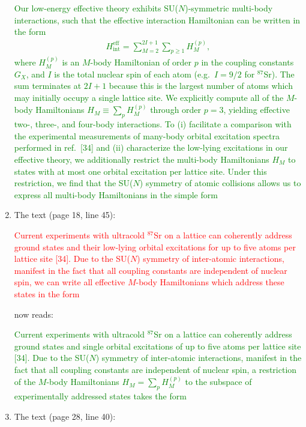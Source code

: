 \documentclass[preprint]{revtex4-1}
\renewcommand{\t}{\text} %
\newcommand{\1}{\mathds{1}}
\newcommand{\red}[1]{\textcolor{red}{#1}}
\newcommand{\green}[1]{\textcolor{green}{#1}}
\newcounter{point}
\begin{document}
\begin{enumerate}[label=(R1.\arabic{point}.\arabic*)]
  \green{Our low-energy effective theory exhibits SU($N$)-symmetric
    multi-body interactions, such that the effective interaction
    Hamiltonian can be written in the form
    \begin{align*}
      H_{\t{int}}^{\t{eff}} = \sum_{M=2}^{2I+1} \sum_{p\ge1} H_M^{(p)},
      \tag{9}
    \end{align*}
    where $H_M^{(p)}$ is an $M$-body Hamiltonian of order $p$ in the
    coupling constants $G_X$, and $I$ is the total nuclear spin of
    each atom (e.g.~$I=9/2$ for ${}^{87}$Sr).  The sum terminates at
    $2I+1$ because this is the largest number of atoms which may
    initially occupy a single lattice site.  We explicitly compute all
    of the $M$-body Hamiltonians $H_M\equiv\sum_p H_M^{(p)}$ through
    order $p=3$, yielding effective two-, three-, and four-body
    interactions.  To (i) facilitate a comparison with the
    experimental measurements of many-body orbital excitation spectra
    performed in ref.~[34] and (ii) characterize the low-lying
    excitations in our effective theory, we additionally restrict the
    multi-body Hamiltonians $H_M$ to states with at most one orbital
    excitation per lattice site.  Under this restriction, we find that
    the SU($N$) symmetry of atomic collisions allows us to express all
    multi-body Hamiltonians in the simple form}


\item The text (page 18, line 45):

  \red{Current experiments with ultracold ${}^{87}$Sr on a lattice can
    coherently address ground states and their low-lying orbital
    excitations for up to five atoms per lattice site [34].  Due to
    the SU($N$) symmetry of inter-atomic interactions, manifest in the
    fact that all coupling constants are independent of nuclear spin,
    we can write all effective $M$-body Hamiltonians which address
    these states in the form}

  now reads:

  \green{Current experiments with ultracold ${}^{87}$Sr on a lattice
    can coherently address ground states and single orbital
    excitations of up to five atoms per lattice site [34].  Due to the
    SU($N$) symmetry of inter-atomic interactions, manifest in the
    fact that all coupling constants are independent of nuclear spin,
    a restriction of the $M$-body Hamiltonians $H_M=\sum_p H_M^{(p)}$
    to the subspace of experimentally addressed states takes the form}


\item The text (page 28, line 40):


\end{enumerate}
\end{document}
